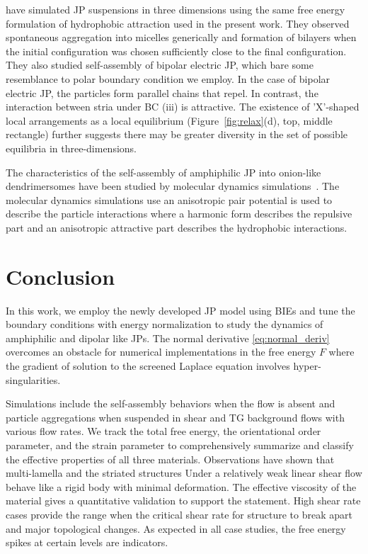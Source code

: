 \documentclass[prb,preprint,showpacs,preprintnumbers,amsmath,amssymb,longbibliography]{revtex4-1}
\begin{document}
\citet{kohl-cor-che-vee22} have simulated JP suspensions in three
dimensions using the same free energy formulation of hydrophobic
attraction used in the present work. They observed spontaneous
aggregation into micelles generically and formation of bilayers when the
initial configuration was chosen sufficiently close to the final
configuration. They also studied self-assembly of bipolar electric JP,
which bare some resemblance to polar boundary condition we employ. In
the case of bipolar electric JP, the particles form parallel chains that
repel. In contrast, the interaction between stria under BC (iii) is
attractive. The existence of 'X'-shaped local arrangements as a local
equilibrium (Figure~\ref{fig:relax}(d), top, middle rectangle) further
suggests there may be greater diversity in the set of possible
equilibria in three-dimensions.

The characteristics of the self-assembly of amphiphilic JP into
onion-like dendrimersomes have been studied by molecular dynamics
simulations~\cite{C9NR05885K}. The molecular dynamics simulations use an
anisotropic pair potential is used to describe the particle interactions
where a harmonic form describes the repulsive part and an anisotropic
attractive part describes the hydrophobic interactions.

\section{Conclusion}
\label{sec:conclusion}


In this work, we employ the newly developed JP model using BIEs and tune 
the boundary conditions with energy normalization to study the dynamics of 
amphiphilic and dipolar like JPs. The normal derivative \eqref{eq:normal_deriv} 
overcomes an obstacle for numerical implementations in the free energy $F$ 
where the gradient of solution to the screened Laplace equation involves 
hyper-singularities.

Simulations include the self-assembly behaviors when the flow is absent and 
particle aggregations when suspended in shear and TG background flows with 
various flow rates. We track the total free energy, the orientational order 
parameter, and the strain parameter to comprehensively summarize and classify 
the effective properties of all three materials. Observations have shown that 
multi-lamella and the striated structures Under a relatively weak linear shear flow 
behave like a rigid body with minimal deformation. The effective viscosity of the 
material gives a quantitative validation to support the statement. High shear rate 
cases provide the range when the critical shear rate for structure to break apart 
and major topological changes. As expected in all case studies, the free energy 
spikes at certain levels are indicators. 
\end{document}
